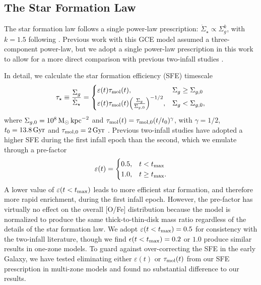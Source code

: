\documentclass[twocolumn,twocolappendix,linenumbers]{aastex631}
\newcommand{\kpc}{\,{\rm kpc}}
\begin{document}
\subsection{The Star Formation Law}
\label{sec:sf-law}

The star formation law follows a single power-law prescription: $\dot\Sigma_\star\propto\Sigma_g^k$, with $k=1.5$ following \citet{kennicutt_global_1998}. Previous work with this GCE model \citep[e.g.,][]{johnson_stellar_2021,dubay_galactic_2024} assumed a three-component power-law, but we adopt a single power-law prescription in this work to allow for a more direct comparison with previous two-infall studies \citep[e.g.,][]{spitoni_remind_2024}. 

In detail, we calculate the star formation efficiency (SFE) timescale
\begin{equation}
    \label{eq:sf-law}
    \tau_\star \equiv \frac{\Sigma_g}{\dot\Sigma_\star} = 
    \begin{cases}
        \varepsilon(t) \tau_{\rm mol}(t),   & \Sigma_g \ge \Sigma_{g,0} \\
        \varepsilon(t) \tau_{\rm mol}(t) \Big(\frac{\Sigma_g}{\Sigma_{g,0}}\Big)^{-1/2}, & \Sigma_g < \Sigma_{g,0},
    \end{cases}
\end{equation}
where $\Sigma_{g,0} = 10^8\,{\rm M}_\odot\kpc^{-2}$ and $\tau_{\rm mol}(t)=\tau_{\rm mol,0}(t/t_0)^\gamma$, with $\gamma=1/2$, $t_0=13.8\,{\rm Gyr}$ and $\tau_{\rm mol,0}=2\,{\rm Gyr}$ \citep{leroy_star_2008}. Previous two-infall studies \citep[e.g.,][]{spitoni_galactic_2019,spitoni_galactic_2020,palla_chemical_2020} have adopted a higher SFE during the first infall epoch than the second, which we emulate through a pre-factor
\begin{equation}
    \label{eq:sfe-prefactor}
    \varepsilon(t) = 
    \begin{cases}
        0.5, & t < t_{\rm max} \\
        1.0, & t \ge t_{\rm max}.
    \end{cases}
\end{equation}
A lower value of $\varepsilon(t<t_{\rm max})$ leads to more efficient star formation, and therefore more rapid enrichment, during the first infall epoch. However, the pre-factor has virtually no effect on the overall [O/Fe] distribution because the model is normalized to produce the same thick-to-thin-disk mass ratio regardless of the details of the star formation law. We adopt $\varepsilon(t<t_{\rm max})=0.5$ for consistency with the two-infall literature, though we find $\epsilon(t<t_{\rm max})=0.2$ or $1.0$ produce similar results in one-zone models. To guard against over-correcting the SFE in the early Galaxy, we have tested eliminating either $\varepsilon(t)$ or $\tau_{\rm mol}(t)$ from our SFE prescription in multi-zone models and found no substantial difference to our results.
\end{document}
